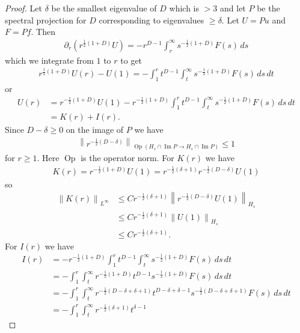 \documentclass[a4paper,10pt,reqno]{amsart}
\theoremstyle{plain}
\numberwithin{equation}{section}
\begin{document}
\begin{proof}
Let $\delta$ be the smallest eigenvalue of $D$ which is $> 3$ and 
let $P$ be the spectral projection for $D$ corresponding to eigenvalues $\geq \delta$. Let $U = P u$ and $F = P f$. Then
\begin{align}
\partial_r \left( r^{\frac{1}{2}(1+D)} U \right)
= - r^{D-1} \int_r^\infty s^{-\frac{1}{2}(1+D)} F(s) \, ds 
\end{align}
which we integrate from $1$ to $r$ to get
\begin{align}
r^{\frac{1}{2}(1+D)} U(r) - U(1)
= - 
\int_1^r
t^{D-1} \int_t^\infty s^{-\frac{1}{2}(1+D)} F(s) \, ds 
\, dt
\end{align}
or
\begin{align}
U(r) 
&= r^{- \frac{1}{2}(1+D)}  U(1) 
-  r^{-\frac{1}{2}(1+D)} \int_1^r
t^{D-1} \int_t^\infty s^{-\frac{1}{2}(1+D)} F(s) \, ds 
\, dt \\
&= K(r) + I(r).
\end{align}
Since $D - \delta \geq 0$ on the image of $P$ we have
\begin{align}
\left\| r^{-\frac{1}{2} (D - \delta) }
\right\|_{\operatorname{Op}(H_s \cap \operatorname{Im}P
\to H_s \cap \operatorname{Im}P)}
\leq 1
\end{align}
for $r \geq 1$. Here $\operatorname{Op}$ is the operator norm. For $K(r)$ we have 
\begin{align}
K(r) 
= 
r^{- \frac{1}{2}(1+D)}  U(1)  
=
r^{- \frac{1}{2}(\delta + 1)} r^{- \frac{1}{2}(D - \delta)}  U(1)
\end{align}
so
\begin{align}
\left\| K(r) \right\|_{L^\infty} 
&\leq 
C r^{- \frac{1}{2}(\delta + 1)}  
\left\| r^{- \frac{1}{2}(D - \delta)}  U(1) \right\|_{H_s} \\
&\leq 
C r^{- \frac{1}{2}(\delta + 1)}
\left\| U(1) \right\|_{H_s} \\
&\leq
C r^{- \frac{1}{2}(\delta + 1)}.
\end{align}
For $I(r)$ we have
\begin{align}
I(r)
&=
-r^{-\frac{1}{2}(1+D)} \int_1^r
t^{D-1} \int_t^\infty s^{-\frac{1}{2}(1+D)} F(s) \, ds \, dt \\
&= 
- \int_1^r \int_t^\infty 
r^{-\frac{1}{2}(1+D)}
t^{D-1}
s^{-\frac{1}{2}(1+D)} F(s) \, ds \, dt \\
&=
- \int_1^r \int_t^\infty 
r^{-\frac{1}{2}(D -\delta + \delta +1)}
t^{D-\delta + \delta-1}
s^{-\frac{1}{2}(D-\delta + \delta+1)} F(s) 
\, ds \, dt \\
&=
- \int_1^r \int_t^\infty 
r^{-\frac{1}{2}(\delta +1)}
t^{\delta-1}

\end{align}
\end{proof}
\end{document}
